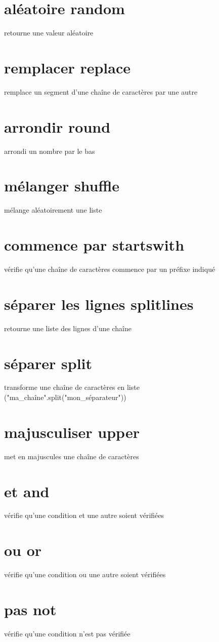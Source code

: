 \documentclass{book}
\begin{document}
\section{aléatoire random }
  retourne une valeur aléatoire
\section{remplacer replace }
  remplace un segment d'une chaîne de caractères par une autre
\section{arrondir round }
  arrondi un nombre par le bas
\section{mélanger shuffle }
  mélange aléatoirement une liste
\section{commence par startswith }
  vérifie qu'une chaîne de caractères commence par un préfixe indiqué
\section{séparer les lignes splitlines }
  retourne une liste des lignes d'une chaîne
\section{séparer split }
  transforme une chaîne de caractères en liste ("ma\_chaîne".split("mon\_séparateur"))
\section{majusculiser upper }
  met en majuscules une chaîne de caractères
\section{et and }
  vérifie qu'une condition et une autre soient vérifiées
\section{ou or }
  vérifie qu'une condition ou une autre soient vérifiées
\section{pas not }
  vérifie qu'une condition n'est pas vérifiée
\end{document}
